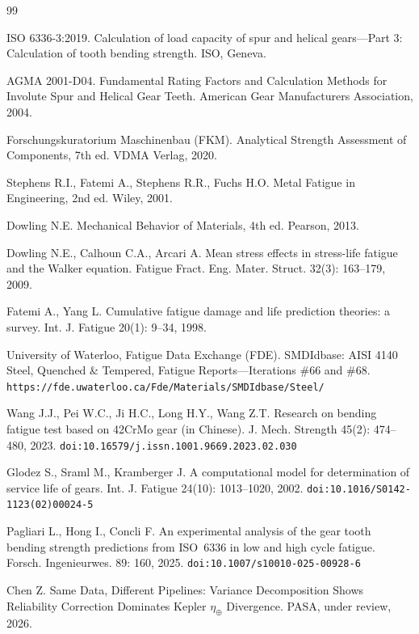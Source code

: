 \documentclass[12pt,a4paper]{article}
\begin{document}
\begin{thebibliography}{99}

ISO 6336-3:2019. Calculation of load capacity of spur and helical
gears---Part 3: Calculation of tooth bending strength. ISO, Geneva.

AGMA 2001-D04. Fundamental Rating Factors and Calculation Methods for
Involute Spur and Helical Gear Teeth. American Gear Manufacturers
Association, 2004.

Forschungskuratorium Maschinenbau (FKM). Analytical Strength Assessment
of Components, 7th ed. VDMA Verlag, 2020.

Stephens R.I., Fatemi A., Stephens R.R., Fuchs H.O. Metal Fatigue in
Engineering, 2nd ed. Wiley, 2001.

Dowling N.E. Mechanical Behavior of Materials, 4th ed. Pearson, 2013.

Dowling N.E., Calhoun C.A., Arcari A. Mean stress effects in
stress-life fatigue and the Walker equation. Fatigue Fract. Eng. Mater.
Struct. 32(3): 163--179, 2009.

Fatemi A., Yang L. Cumulative fatigue damage and life prediction
theories: a survey. Int. J. Fatigue 20(1): 9--34, 1998.

University of Waterloo, Fatigue Data Exchange (FDE). SMDIdbase: AISI
4140 Steel, Quenched \& Tempered, Fatigue Reports---Iterations \#66 and
\#68. \texttt{https://fde.uwaterloo.ca/Fde/Materials/SMDIdbase/Steel/}

Wang J.J., Pei W.C., Ji H.C., Long H.Y., Wang Z.T. Research on bending
fatigue test based on 42CrMo gear (in Chinese). J. Mech. Strength
45(2): 474--480, 2023. \texttt{doi:10.16579/j.issn.1001.9669.2023.02.030}

Glodez S., Sraml M., Kramberger J. A computational model for
determination of service life of gears. Int. J. Fatigue 24(10):
1013--1020, 2002. \texttt{doi:10.1016/S0142-1123(02)00024-5}

Pagliari L., Hong I., Concli F. An experimental analysis of the gear
tooth bending strength predictions from ISO~6336 in low and high cycle
fatigue. Forsch. Ingenieurwes. 89: 160, 2025.
\texttt{doi:10.1007/s10010-025-00928-6}

Chen Z. Same Data, Different Pipelines: Variance Decomposition Shows
Reliability Correction Dominates Kepler $\eta_\oplus$ Divergence.
PASA, under review, 2026.

\end{thebibliography}
\end{document}
